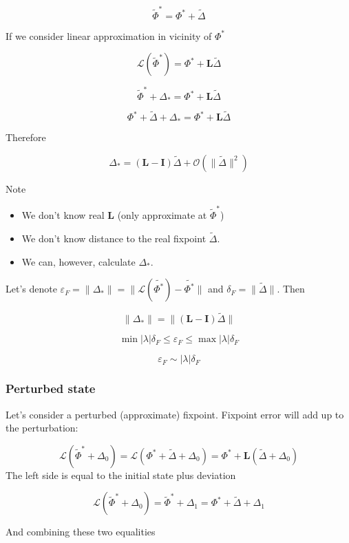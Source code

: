 \documentclass[a4paper,12pt]{article}
\newcommand{\wt}{\widetilde} %
\newcommand{\FP}{\Phi^*}%
\newcommand{\D}{\Delta}%
\begin{document}
$$\wt \FP= \FP + \wt{\D}$$

If we consider linear approximation in vicinity of $\FP$


$$ \mathcal{L}(\wt \FP) = \FP + \mathbf{L}  \wt{\D}$$

$$ \wt \FP + \D_* = \FP + \mathbf{L}  \wt{\D}$$

$$  \FP + \wt{\D} + \D_* = \FP + \mathbf{L}  \wt{\D}$$

Therefore

\begin{equation}
\D_* = ( \mathbf{L} - \mathbf{I} ) \wt{\D} + \mathcal{O}(\lVert \wt{\D} \rVert^2)
\label{eqn:delta_star}
\end{equation}



Note
\begin{itemize}

\item We don't know real $\mathbf{L}$ (only approximate at $\wt \FP$)
\item We don't know distance to the real fixpoint $\wt{\D}$.
\item We can, however, calculate $\D_*$.

\end{itemize}

Let's denote
 $\varepsilon_{F}
 = \lVert \D_* \rVert
 =\lVert \mathcal{L}(\wt{\FP}) - \wt{\FP}  \rVert$
and $\delta_F = \lVert \wt{\D} \rVert $. Then

$$
\lVert \D_* \rVert = \lVert ( \mathbf{L} - \mathbf{I} ) \wt{\D} \rVert
$$


$$
\min|\lambda| \delta_F
\leq \varepsilon_{F}
\leq \max|\lambda| \delta_F
$$

$$
\varepsilon_{F} \sim |\lambda| \delta_F
$$



\subsubsection*{Perturbed state}
Let's consider a perturbed (approximate) fixpoint. Fixpoint error will add up to the perturbation:

$$
\mathcal{L}(\wt{\Phi}^* + \D_0)
= \mathcal{L}(\FP + \wt  \D +  \D_0 )
= \FP +  \mathbf{L}  ( \wt{\D} +  \D_0 )
$$
The left side is equal to the initial state plus deviation

$$
\mathcal{L}(\wt \FP  + \D_0)
= \wt \FP + \D_1
= \FP + \wt{\D}  + \D_1
$$

And combining these two equalities
\end{document}
